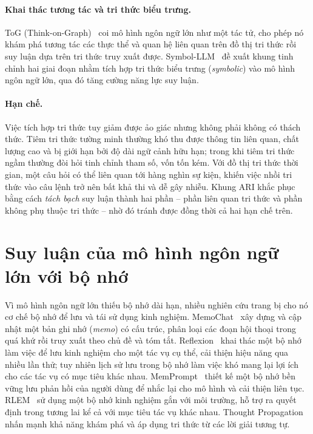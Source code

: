 \paragraph{Khai thác tương tác và tri thức biểu trưng.} ToG (Think-on-Graph)~\cite{sun2023tog} coi
mô hình ngôn ngữ lớn như một tác tử, cho phép nó khám phá tương tác các thực thể và quan hệ liên
quan trên đồ thị tri thức rồi suy luận dựa trên tri thức truy xuất được. Symbol-LLM~
\cite{xu2023symbolllm} đề xuất khung tinh chỉnh hai giai đoạn nhằm tích hợp tri thức biểu trưng
(\textit{symbolic}) vào mô hình ngôn ngữ lớn, qua đó tăng cường năng lực suy luận.

\paragraph{Hạn chế.} Việc tích hợp tri thức tuy giảm được ảo giác nhưng không phải không có thách
thức. Tiêm tri thức tường minh thường khó thu được thông tin liên quan, chất lượng cao và bị giới
hạn bởi độ dài ngữ cảnh hữu hạn; trong khi tiêm tri thức ngầm thường đòi hỏi tinh chỉnh tham số,
vốn tốn kém. Với đồ thị tri thức thời gian, một câu hỏi có thể liên quan tới hàng nghìn sự kiện,
khiến việc nhồi tri thức vào câu lệnh trở nên bất khả thi và dễ gây nhiễu. Khung ARI khắc phục bằng
cách \emph{tách bạch} suy luận thành hai phần -- phần liên quan tri thức và phần không phụ thuộc tri
thức -- nhờ đó tránh được đồng thời cả hai hạn chế trên.

\section{Suy luận của mô hình ngôn ngữ lớn với bộ nhớ}
\label{sec:llm-memory}

Vì mô hình ngôn ngữ lớn thiếu bộ nhớ dài hạn, nhiều nghiên cứu trang bị cho nó cơ chế bộ nhớ để
lưu và tái sử dụng kinh nghiệm. MemoChat~\cite{lu2023memochat} xây dựng và cập nhật một bản ghi nhớ
(\textit{memo}) có cấu trúc, phân loại các đoạn hội thoại trong quá khứ rồi truy xuất theo chủ đề
và tóm tắt. Reflexion~\cite{shinn2023reflexion} khai thác một bộ nhớ làm việc để lưu kinh nghiệm
cho một tác vụ cụ thể, cải thiện hiệu năng qua nhiều lần thử; tuy nhiên lịch sử lưu trong bộ nhớ
làm việc khó mang lại lợi ích cho các tác vụ có mục tiêu khác nhau. MemPrompt~\cite{madaan2022memprompt}
thiết kế một bộ nhớ bền vững lưu phản hồi của người dùng để nhắc lại cho mô hình và cải thiện liên
tục. RLEM~\cite{zhang2023rlem} sử dụng một bộ nhớ kinh nghiệm gắn với môi trường, hỗ trợ ra quyết
định trong tương lai kể cả với mục tiêu tác vụ khác nhau. Thought Propagation~\cite{yu2023tp} nhấn
mạnh khả năng khám phá và áp dụng tri thức từ các lời giải tương tự.

